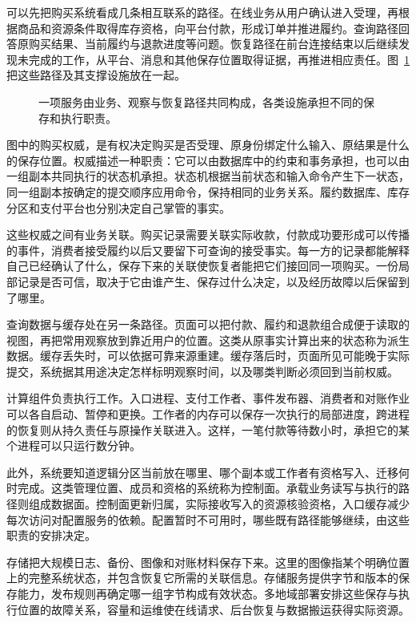 可以先把购买系统看成几条相互联系的路径。在线业务从用户确认进入受理，再根据商品和资源条件取得库存资格，向平台付款，形成订单并推进履约。查询路径回答原购买结果、当前履约与退款进度等问题。恢复路径在前台连接结束以后继续发现未完成的工作，从平台、消息和其他保存位置取得证据，再推进相应责任。图~\ref{fig:overview-panorama} 把这些路径及其支撑设施放在一起。

\begin{figure}[htbp]
\centering

\caption{一项服务由业务、观察与恢复路径共同构成，各类设施承担不同的保存和执行职责。}
\label{fig:overview-panorama}
\end{figure}

图中的购买权威，是有权决定购买是否受理、原身份绑定什么输入、原结果是什么的保存位置。权威描述一种职责：它可以由数据库中的约束和事务承担，也可以由一组副本共同执行的状态机承担。状态机根据当前状态和输入命令产生下一状态，同一组副本按确定的提交顺序应用命令，保持相同的业务关系。履约数据库、库存分区和支付平台也分别决定自己掌管的事实。

这些权威之间有业务关联。购买记录需要关联实际收款，付款成功要形成可以传播的事件，消费者接受履约以后又要留下可查询的接受事实。每一方的记录都能解释自己已经确认了什么，保存下来的关联使恢复者能把它们接回同一项购买。一份局部记录是否可信，取决于它由谁产生、保存过什么决定，以及经历故障以后保留到了哪里。

查询数据与缓存处在另一条路径。页面可以把付款、履约和退款组合成便于读取的视图，再把常用观察放到靠近用户的位置。这类从原事实计算出来的状态称为派生数据。缓存丢失时，可以依据可靠来源重建。缓存落后时，页面所见可能晚于实际提交，系统据其用途决定怎样标明观察时间，以及哪类判断必须回到当前权威。

计算组件负责执行工作。入口进程、支付工作者、事件发布器、消费者和对账作业可以各自启动、暂停和更换。工作者的内存可以保存一次执行的局部进度，跨进程的恢复则从持久责任与原操作关联进入。这样，一笔付款等待数小时，承担它的某个进程可以只运行数分钟。

此外，系统要知道逻辑分区当前放在哪里、哪个副本或工作者有资格写入、迁移何时完成。这类管理位置、成员和资格的系统称为控制面。承载业务读写与执行的路径则组成数据面。控制面更新归属，实际接收写入的资源核验资格，入口缓存减少每次访问对配置服务的依赖。配置暂时不可用时，哪些既有路径能够继续，由这些职责的安排决定。

存储把大规模日志、备份、图像和对账材料保存下来。这里的图像指某个明确位置上的完整系统状态，并包含恢复它所需的关联信息。存储服务提供字节和版本的保存能力，发布规则再确定哪一组字节构成有效状态。多地域部署安排这些保存与执行位置的故障关系，容量和运维使在线请求、后台恢复与数据搬运获得实际资源。

